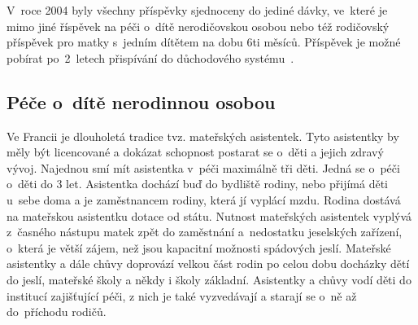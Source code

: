 				V roce 2004 byly všechny příspěvky sjednoceny do jediné dávky, ve které je mimo jiné říspěvek na péči o~dítě nerodičovskou osobou nebo též rodičovský příspěvek pro matky s~jedním dítětem na dobu 6ti měsíců. Příspěvek je možné pobírat po 2 letech přispívání do důchodového systému~\citep{Dennipece}.

			\subsection{Péče o~dítě nerodinnou osobou}
				Ve Francii je dlouholetá tradice tvz. mateřských asistentek. Tyto asistentky by měly být licencované a dokázat schopnost postarat se o~děti a jejich zdravý vývoj. Najednou smí mít asistentka v~péči maximálně tři děti. Jedná se o~péči o~děti do 3 let. Asistentka dochází buď do bydliště rodiny, nebo přijímá děti u~sebe doma a je zaměstnancem rodiny, která jí vyplácí mzdu. Rodina dostává na mateřskou asistentku dotace od státu.
				Nutnost mateřských asistentek vyplývá z časného nástupu matek zpět do zaměstnání a nedostatku jeselských zařízení, o~která je větší zájem, než jsou kapacitní možnosti spádových jeslí. Mateřské asistentky a dále chůvy doprovází velkou část rodin po celou dobu docházky dětí do jeslí, mateřské školy a někdy i školy základní. Asistentky a chůvy vodí děti do institucí zajišťující péči, z nich je také vyzvedávají a starají se o~ně až do příchodu rodičů.
